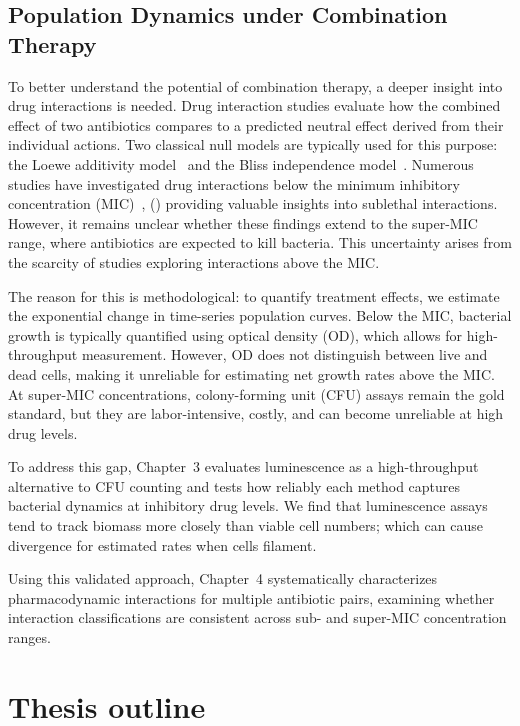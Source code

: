 \documentclass[../main.tex]{subfiles}
\begin{document}
\subsection{Population Dynamics under Combination Therapy}
To better understand the potential of combination therapy, a deeper insight into drug interactions is needed.
Drug interaction studies evaluate how the combined effect of two antibiotics compares to a predicted neutral effect derived from their individual actions.
Two classical null models are typically used for this purpose: the Loewe additivity model~\cite{Loewe1926} and the Bliss independence model~\cite{Bliss1939}.
Numerous studies have investigated drug interactions below the minimum inhibitory concentration (MIC)~\cite{Yeh2006}, (\cite{...}) providing valuable insights into sublethal interactions.
However, it remains unclear whether these findings extend to the super-MIC range, where antibiotics are expected to kill bacteria.
This uncertainty arises from the scarcity of studies exploring interactions above the MIC.

The reason for this is methodological: to quantify treatment effects, we estimate the exponential change in time-series population curves.
Below the MIC, bacterial growth is typically quantified using optical density (OD), which allows for high-throughput measurement.
However, OD does not distinguish between live and dead cells, making it unreliable for estimating net growth rates above the MIC.
At super-MIC concentrations, colony-forming unit (CFU) assays remain the gold standard, but they are labor-intensive, costly, and can become unreliable at high drug levels.

To address this gap, Chapter~3 evaluates luminescence as a high-throughput alternative to CFU counting and tests how reliably each method captures bacterial dynamics at inhibitory drug levels.
We find that luminescence assays tend to track biomass more closely than viable cell numbers; which can cause divergence for estimated rates when cells filament.

Using this validated approach, Chapter~4 systematically characterizes pharmacodynamic interactions for multiple antibiotic pairs, examining whether interaction classifications are consistent across sub- and super-MIC concentration ranges.

\section{Thesis outline}
\end{document}
